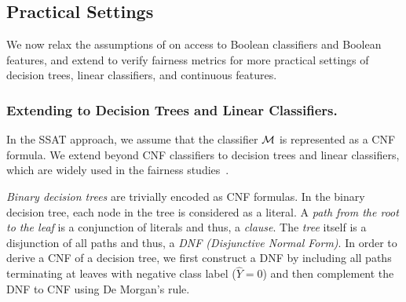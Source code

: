 \subsection{Practical Settings}
\label{sec:practical-setting}
We now relax the assumptions of {\justicia} on access to Boolean classifiers and Boolean features, and extend {\justicia} to verify fairness metrics for more practical settings of decision trees, linear classifiers, and continuous features.

\subsubsection{Extending {\justicia} to Decision Trees and Linear Classifiers. }
In the SSAT approach, we assume that the classifier $\mathcal{M}$ is represented as a CNF formula.  
We extend {\justicia} beyond CNF classifiers to decision trees and linear classifiers, which are widely used in the fairness studies~\cite{zemel2013learning,raff2018fair,zhang2019faht}.

\textit{Binary decision trees} are trivially encoded as  CNF formulas.  In the binary decision tree, each node in the tree is considered as a literal. A \textit{path from the root to the leaf} is a conjunction of literals and thus, a \textit{clause}. The \textit{tree} itself is a disjunction of all paths and thus, a \textit{DNF (Disjunctive Normal Form)}. In order to derive a CNF of a decision tree, we first construct a DNF by including all paths terminating at leaves with negative class label ($ \hat{Y} = 0 $) and then complement the DNF to CNF using De Morgan's rule. 

